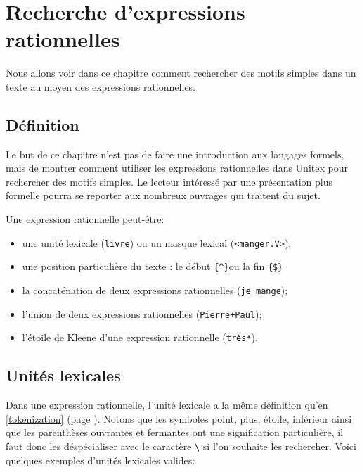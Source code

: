 \chapter{Recherche d’expressions rationnelles}
\label{chap-regexp}

Nous allons voir dans ce chapitre comment rechercher des motifs simples dans un texte
au moyen des expressions rationnelles.

\section{Définition}

Le but de ce chapitre n’est pas de faire une introduction aux langages formels, mais
de montrer comment utiliser les expressions rationnelles dans Unitex pour rechercher des
motifs simples. Le lecteur intéressé par une présentation plus formelle pourra se reporter
aux nombreux ouvrages qui traitent du sujet.


\bigskip \noindent Une expression rationnelle peut-être:

\begin{itemize}
  \item une unité lexicale (\verb+livre+) ou un masque lexical
  (\verb+<manger.V>+);
  \item une position particulière du texte : le début \verb+{^}+ou la fin \verb+{$}+
  \item la concaténation de deux expressions rationnelles (\verb+je mange+);
  \item l'union de deux expressions rationnelles (\verb$Pierre+Paul$); 
  \item l’étoile de Kleene d’une expression rationnelle (\verb+très*+).
\end{itemize}


\section{Unités lexicales}

Dans une expression rationnelle, l’unité lexicale a la même définition qu’en \ref{tokenization}
(page \pageref{tokenization}). Notons que les symboles point, plus, étoile, inférieur ainsi que les
parenthèses ouvrantes et fermantes ont une signification particulière, il faut donc les
déspécialiser avec le caractère \verb+\+ si l’on souhaite les rechercher. Voici quelques exemples
d’unités lexicales valides: \index{\verb+\+}

